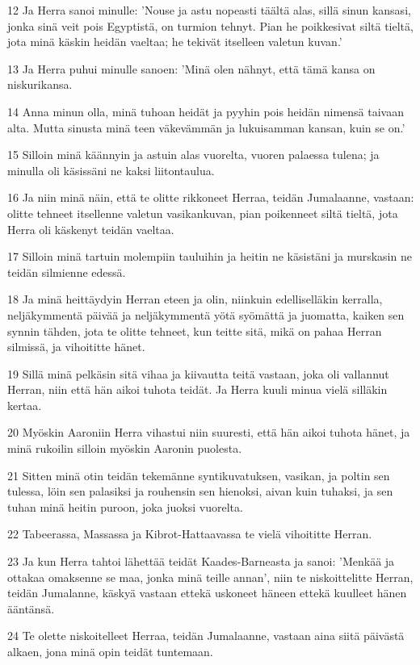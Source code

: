 \par 12 Ja Herra sanoi minulle: 'Nouse ja astu nopeasti täältä alas, sillä sinun kansasi, jonka sinä veit pois Egyptistä, on turmion tehnyt. Pian he poikkesivat siltä tieltä, jota minä käskin heidän vaeltaa; he tekivät itselleen valetun kuvan.'
\par 13 Ja Herra puhui minulle sanoen: 'Minä olen nähnyt, että tämä kansa on niskurikansa.
\par 14 Anna minun olla, minä tuhoan heidät ja pyyhin pois heidän nimensä taivaan alta. Mutta sinusta minä teen väkevämmän ja lukuisamman kansan, kuin se on.'
\par 15 Silloin minä käännyin ja astuin alas vuorelta, vuoren palaessa tulena; ja minulla oli käsissäni ne kaksi liitontaulua.
\par 16 Ja niin minä näin, että te olitte rikkoneet Herraa, teidän Jumalaanne, vastaan: olitte tehneet itsellenne valetun vasikankuvan, pian poikenneet siltä tieltä, jota Herra oli käskenyt teidän vaeltaa.
\par 17 Silloin minä tartuin molempiin tauluihin ja heitin ne käsistäni ja murskasin ne teidän silmienne edessä.
\par 18 Ja minä heittäydyin Herran eteen ja olin, niinkuin edelliselläkin kerralla, neljäkymmentä päivää ja neljäkymmentä yötä syömättä ja juomatta, kaiken sen synnin tähden, jota te olitte tehneet, kun teitte sitä, mikä on pahaa Herran silmissä, ja vihoititte hänet.
\par 19 Sillä minä pelkäsin sitä vihaa ja kiivautta teitä vastaan, joka oli vallannut Herran, niin että hän aikoi tuhota teidät. Ja Herra kuuli minua vielä silläkin kertaa.
\par 20 Myöskin Aaroniin Herra vihastui niin suuresti, että hän aikoi tuhota hänet, ja minä rukoilin silloin myöskin Aaronin puolesta.
\par 21 Sitten minä otin teidän tekemänne syntikuvatuksen, vasikan, ja poltin sen tulessa, löin sen palasiksi ja rouhensin sen hienoksi, aivan kuin tuhaksi, ja sen tuhan minä heitin puroon, joka juoksi vuorelta.
\par 22 Tabeerassa, Massassa ja Kibrot-Hattaavassa te vielä vihoititte Herran.
\par 23 Ja kun Herra tahtoi lähettää teidät Kaades-Barneasta ja sanoi: 'Menkää ja ottakaa omaksenne se maa, jonka minä teille annan', niin te niskoittelitte Herran, teidän Jumalanne, käskyä vastaan ettekä uskoneet häneen ettekä kuulleet hänen ääntänsä.
\par 24 Te olette niskoitelleet Herraa, teidän Jumalaanne, vastaan aina siitä päivästä alkaen, jona minä opin teidät tuntemaan.

